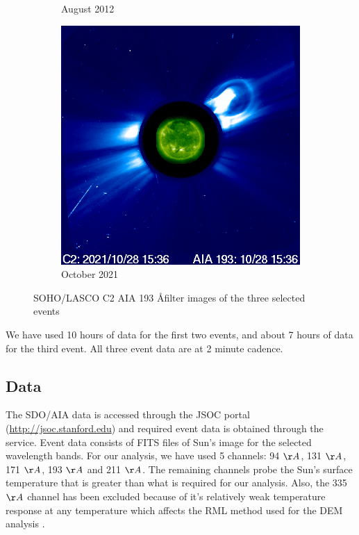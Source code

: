 \begin{figure}[h!]
\begin{subfigure}[b]{0.3\textwidth}
        \caption[August  2012 CME]{August  2012}
        \label{fig:soho_cme_aug_31_2012}
    \end{subfigure}
    \hfill
    \begin{subfigure}[b]{0.3\textwidth}
        \includegraphics[width=\textwidth]{images/soho_cme_oct_28_2021_aia193.png}
        \caption[October  2021]{October  2021}
        \label{fig:soho_cme_oct_28_2021}
    \end{subfigure}
    \caption[SOHO/LASCO C2 images with AIA 193 \AA filter]{SOHO/LASCO C2 AIA 193 \AA filter images of the three selected events}
    \label{fig:cme_events_soho_pics_aia193}
\end{figure}

\noindent We have used 10 hours of data for the first two events, and about 7 hours of data for the third event. All three event data are at 2 minute cadence.

\subsection{Data}
\label{sec:data_used}

The SDO/AIA data is accessed through the JSOC portal (\url{http://jsoc.stanford.edu}) and required event data is obtained through the service. Event data consists of FITS files of Sun's image for the selected wavelength bands. For our analysis, we have used 5 channels: 94 $\AA$, 131 $\AA$, 171 $\AA$, 193 $\AA$ and 211 $\AA$. The remaining channels probe the Sun's surface temperature that is greater than what is required for our analysis. Also, the 335 $\AA$ channel has been excluded because of it's relatively weak temperature response at any temperature which affects the RML method used for the DEM analysis \citep{Massa2023}.

